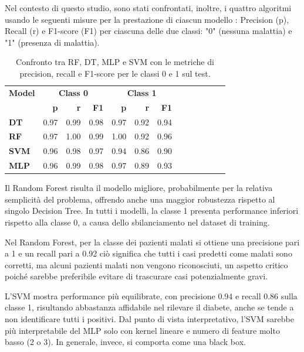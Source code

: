 \documentclass[conference]{IEEEtran}
\begin{document}
Nel contesto di questo studio, sono stati confrontati, inoltre, i quattro algoritmi usando le seguenti misure per la prestazione di ciascun modello : Precision (p), Recall (r) e F1-score (F1) per ciascuna delle due classi: "0" (nessuna malattia) e "1" (presenza di malattia).
\begin{table}[H]
\centering
\small
\begin{tabular}{l|rrr|rrr|rrr|rrr}
\toprule
\textbf{Model} & \multicolumn{3}{c|}{\textbf{Class 0}} & \multicolumn{3}{c|}{\textbf{Class 1}} \\
\cmidrule(r){2-4} \cmidrule(r){5-7}
 & \textbf{p} & \textbf{r} & \textbf{F1} & \textbf{p} & \textbf{r} & \textbf{F1} \\
\midrule
\textbf{DT} & 0.97 & 0.99 & 0.98 & 0.97 & 0.92 & 0.94 \\
\textbf{RF} & 0.97 & 1.00 & 0.99 & 1.00 & 0.92 & 0.96 \\
\textbf{SVM} & 0.96 & 0.98 & 0.97 & 0.94 & 0.86 & 0.90 \\
\textbf{MLP} & 0.96 & 0.99 & 0.98 & 0.97 & 0.89 & 0.93 \\
\bottomrule
\end{tabular}
\caption{Confronto tra RF, DT, MLP e SVM con le metriche di precision, recall e F1-score per le classi 0 e 1 sul test.}

\label{tab:classification_report_comparison_1}
\end{table}

Il Random Forest risulta il modello migliore, probabilmente per la relativa semplicità del problema, offrendo anche una maggior robustezza rispetto al singolo Decision Tree. In tutti i modelli, la classe 1 presenta performance inferiori rispetto alla classe 0, a causa dello sbilanciamento nel dataset di training.

Nel Random Forest, per la classe dei pazienti malati si ottiene una precisione pari a 1 e un recall pari a 0.92 ciò significa che tutti i casi predetti come malati sono corretti, ma alcuni pazienti malati non vengono riconosciuti, un aspetto critico poiché sarebbe preferibile evitare di trascurare casi potenzialmente gravi.

L’SVM mostra performance più equilibrate, con precisione 0.94 e recall 0.86 sulla classe 1, risultando abbastanza affidabile nel rilevare il diabete, anche se tende a non identificare tutti i positivi. Dal punto di vista interpretativo, l'SVM sarebbe più interpretabile del MLP solo con kernel lineare e numero di feature molto basso (2 o 3). In generale, invece, si comporta come una black box.
\end{document}
